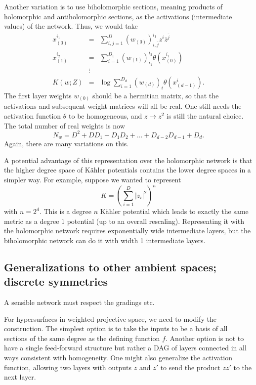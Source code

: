 \documentclass[12pt]{article}
\newcommand{\be}{\begin{equation}}
\newcommand{\ee}{\end{equation}}
\newcommand{\bea}{\begin{eqnarray}}
\newcommand{\eea}{\end{eqnarray}}
\def\bz{\bar{z}}
\def\bj{{\bar{j}}}
\def\bz{\bar{z}}
\begin{document}
Another variation is to use biholomorphic sections, meaning products of holomorphic and antiholomorphic sections,
as the activations (intermediate values) of the network.  Thus, we would take
\bea  \label{eq:defF3}
 x_{(0)}^{i_1} &=& \sum_{i,j=1}^D (w_{(0)})^{i_1}_{i,\bj} z^i \bz^{\bj} \\
 x_{(1)}^{i_2} &=& \sum_{i=1}^{D_1} (w_{(1)})^{i_2}_{i_1} \theta(x_{(0)}^{i_1}) \\
& \vdots & \\
 K(w;Z) &=&  \log \sum_{i=1}^{D_d} (w_{(d)})_{i} \theta( x_{(d-1)}^i ) .
\eea
The first layer weights $w_{(0)}$ should be a hermitian matrix, so that the activations and subsequent
weight matrices will all be real.  One still needs the activation function $\theta$ to be homogeneous,
and $z\rightarrow z^2$ is still the natural choice.  The total number of real weights is now
\be
N_w = D^2 + D D_1 + D_1 D_2 + \ldots + D_{d-2} D_{d-1} + D_d.
\ee
Again, there are many variations on this.

A potential advantage of this representation over the holomorphic network is that the higher degree
space of K\"ahler potentials contains the lower degree spaces in a simpler way.  For example, suppose we wanted to
represent
\be
K = \left( \sum_{i=1}^D |z_i|^2 \right)^n
\ee
with $n=2^d$.  This is a degree $n$ K\"ahler potential which leads to exactly the same metric as a degree $1$
potential (up to an overall rescaling).  Representing it with the holomorphic network requires exponentially
wide intermediate layers, but the biholomorphic network can do it with width 1 intermediate layers.


\subsection{ Generalizations to other ambient spaces; discrete symmetries }

A sensible network must respect the gradings etc. 

For hypersurfaces in weighted projective space, we need to modify the construction.
The simplest option is to take the inputs to be a basis of all sections of the same degree as the
defining function $f$.  Another option is not to have a single feed-forward structure but rather
a DAG of layers connected in all ways consistent with homogeneity.  One might also generalize
the activation function, allowing two layers with outputs $z$ and $z'$ to send the product $zz'$
to the next layer.
\end{document}
